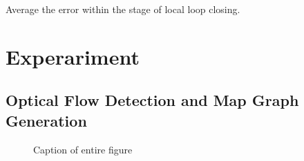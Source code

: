 \documentclass{article}
\begin{document}
Average the error within the stage of local loop closing.

\section{Experariment}

\subsection{Optical Flow Detection and Map Graph Generation}

\begin{figure}
 \hfill
 \hfill

\caption{Caption of entire figure}
\end{figure}





\end{document}
